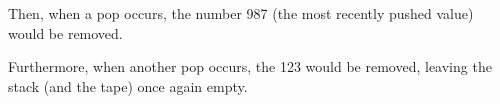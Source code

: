 Then, when a pop occurs, the number 987 (the most recently pushed value) would be removed.

\begin{center}
\end{center}

Furthermore, when another pop occurs, the 123 would be removed, leaving the stack (and the tape) once again empty.

